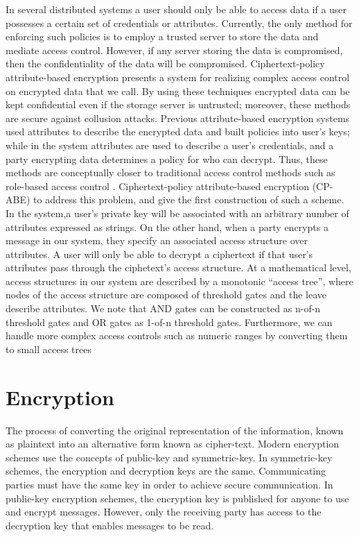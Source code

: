 In several distributed systems a user should only be able to access data if a user possesses a certain set of credentials or attributes. Currently, the only method for enforcing such policies is to employ a trusted server to store the data and mediate access control. However, if any server storing the data is compromised, then the confidentiality of the data will be compromised. Ciphertext-policy attribute-based encryption presents a system for realizing complex access control on encrypted data that we call. By using these techniques encrypted data can be kept confidential even if the storage server is untrusted; moreover, these methods are secure against collusion attacks. Previous attribute-based encryption systems used attributes to describe the encrypted data and built policies into user's keys; while in the system attributes are used to describe a user's credentials, and a party encrypting data determines a policy for who can decrypt. Thus, these methods are conceptually closer to traditional access control methods such as role-based access control .
Ciphertext-policy attribute-based encryption (CP-ABE) to address this problem, and give the first construction of such a scheme. In the system,a user’s private key will be associated with an arbitrary number of attributes expressed as strings. On the other hand, when a party encrypts a message in our system, they specify an associated access structure over attributes. A user will only be able to decrypt a ciphertext if that user’s attributes pass through the ciphetext’s access structure. At a mathematical level, access structures in our system are described by a monotonic “access tree”, where nodes of the access structure are composed of threshold gates and the leave describe attributes. We note that AND gates can be constructed as n-of-n threshold gates and OR gates as 1-of-n threshold gates. Furthermore, we can handle more complex access controls such as numeric ranges by converting them to small access trees 
\section{Encryption}
The process of converting the original representation of the information, known as plaintext into an alternative form known as cipher-text. Modern encryption schemes use the concepts of public-key and symmetric-key. 
In symmetric-key schemes, the encryption and decryption keys are the same. Communicating parties must have the same key in order to achieve secure communication. In public-key encryption schemes, the encryption key is published for anyone to use and encrypt messages. However, only the receiving party has access to the decryption key that enables messages to be read. 
           
